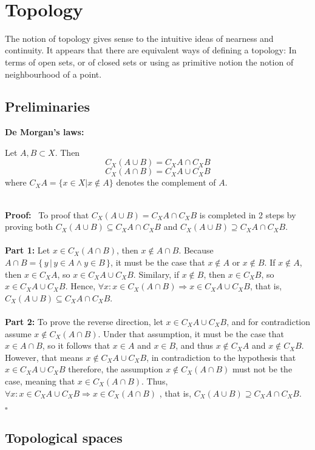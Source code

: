 \documentclass[10pt,a4paper]{article}
\newcounter{numtheorem}
\newcommand{\theorem}[2]{
    \refstepcounter{numtheorem}
    \color{blue}
    \noindent\fbox{\textbf{1.\thenumtheorem }} \textbf{#1:}
    \color{black}
    #2\newline
}
\renewcommand{\proof}[1]{%
    \noindent\textbf{Proof:}~#1%
    \newline%
    \strut\hfill%
    $\square$%
    \newline%
}%
\begin{document}
\tableofcontents
~\newpage

\section{Topology}

The notion of topology gives sense to the intuitive ideas of nearness and continuity. It appears that there are equivalent ways of defining a topology: In terms of open sets, or of closed sets or using as primitive notion the notion of neighbourhood of a point.

\subsection{Preliminaries}

\theorem{De Morgan's laws}{
    Let $A,B\subset X$. Then
    \[C_X\left(A\cup B\right)=C_X A\cap C_X B\]
    \[C_X\left(A\cap B\right)=C_X A\cup C_X B\]
    where $C_XA=\{x\in X|x\notin A\}$ denotes the complement of $A$.
}
\\
\proof{
To proof that $C_X\left(A\cup B\right)=C_X A\cap C_X B$ is completed in 2 steps by proving both $C_X\left(A\cup B\right)\subseteq C_X A\cap C_X B$ and $C_X\left(A\cup B\right)\supseteq C_X A\cap C_X B$.\\\\
\textbf{Part 1:}
Let $x\in C_X(A\cap B)$, then $x\notin A\cap B$.
Because $A\cap B=\{\,y\,|\,y\in A\wedge y\in B\,\}$, it must be the case that $x\notin A$ or $x\notin B$.
If $x\notin A$, then $x\in C_XA$, so $x\in C_XA\cup C_XB$.
Similary, if $x\notin B$, then $x\in C_XB$, so $x\in C_XA\cup C_XB$.
Hence, $\forall x: x\in C_X(A\cap B)\Rightarrow x\in C_XA\cup C_XB$, that is, $C_X\left(A\cup B\right)\subseteq C_X A\cap C_X B$.\\\\
\textbf{Part 2:}
To prove the reverse direction, let $x\in C_XA\cup C_XB$, and for contradiction assume $x\notin C_X(A\cap B)$. Under that assumption, it must be the case that $x\in A\cap B$, so it follows that $x\in A$ and $x\in B$, and thus $x\notin C_XA$ and $x\notin C_XB$. However, that means $x\notin C_XA\cup C_XB$, in contradiction to the hypothesis that $x\in C_XA\cup C_XB$ therefore, the assumption $x\notin C_X(A\cap B)$ must not be the case, meaning that $x\in C_X(A\cap B)$.
Thus, $\forall x: x\in C_XA\cup C_XB\Rightarrow x\in C_X(A\cap B)$ , that is, $C_X\left(A\cup B\right)\supseteq C_X A\cap C_X B$.\\
}

\subsection{Topological spaces}
\end{document}
